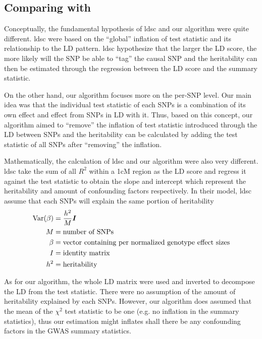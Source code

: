 \documentclass[12pt]{scrbook}
\begin{document}
\subsection{Comparing with }
Conceptually, the fundamental hypothesis of \gls{ldsc} and our algorithm were quite different.
\gls{ldsc} were based on the ``global'' inflation of test statistic and its relationship to the \gls{LD} pattern.
\gls{ldsc} hypothesize that the larger the \gls{LD} score, the more likely will the \gls{SNP} be able to ``tag'' the causal \gls{SNP} and the heritability can then be estimated through the regression between the \gls{LD} score and the summary statistic.

On the other hand, our algorithm focuses more on the per-\gls{SNP} level.
Our main idea was that the individual test statistic of each \glspl{SNP} is a combination of its own effect and effect from \glspl{SNP} in \gls{LD} with it. 
Thus, based on this concept, our algorithm aimed to ``remove'' the inflation of test statistic introduced through the \gls{LD} between \glspl{SNP} and the heritability can be calculated by adding the test statistic of all \glspl{SNP} after ``removing'' the inflation. 

Mathematically, the calculation of \gls{ldsc} and our algorithm were also very different. 
\gls{ldsc} take the sum of all $R^2$ within a 1cM region as the LD score and regress it against the test statistic to obtain the slope and intercept which represent the heritability and amount of confounding factors respectively. 
In their model, \gls{ldsc} assume that each \glspl{SNP} will explain the same portion of heritability
\begin{align}
\mathrm{Var}(\beta)&=\frac{h^2}{M}\boldsymbol{I}\\
M &= \text{number of SNPs}\notag\\
\beta &= \text{vector containing per normalized genotype effect sizes}\notag\\
I &= \text{identity matrix}\notag\\
h^2 &= \text{heritability}\notag
\end{align}

As for our algorithm, the whole \gls{LD} matrix were used and inverted to decompose the \gls{LD} from the test statistic. 
There were no assumption of the amount of heritability explained by each \glspl{SNP}. 
However, our algorithm does assumed that the mean of the $\chi^2$ test statistic to be one (e.g. no inflation in the summary statistics), thus our estimation might inflates shall there be any confounding factors in the \gls{GWAS} summary statistics.
\end{document}
